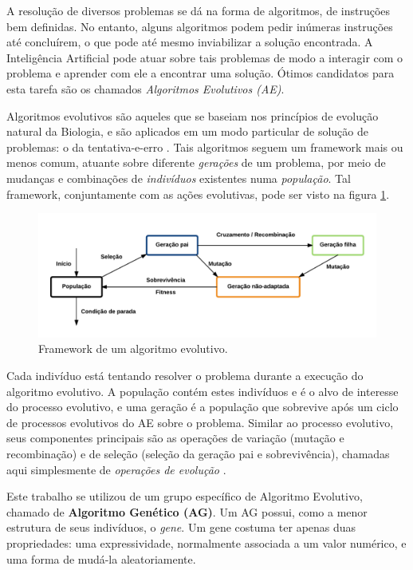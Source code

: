 \label{1_introducao}

A resolução de diversos problemas se dá na forma de algoritmos, de instruções bem definidas. No entanto, alguns algoritmos podem pedir inúmeras instruções até concluírem, o que pode até mesmo inviabilizar a solução encontrada. A Inteligência Artificial pode atuar sobre tais problemas de modo a interagir com o problema e aprender com ele a encontrar uma solução. Ótimos candidatos para esta tarefa são os chamados \emph{Algoritmos Evolutivos (AE)}.

Algoritmos evolutivos são aqueles que se baseiam nos princípios de evolução natural da Biologia, e são aplicados em um modo particular de solução de problemas: o da tentativa-e-erro \cite{eiben2003introduction}. Tais algoritmos seguem um framework mais ou menos comum, atuante sobre diferente \emph{gerações} de um problema, por meio de mudanças e combinações de \emph{indivíduos} existentes numa \emph{população}. Tal framework, conjuntamente com as ações evolutivas, pode ser visto na figura \ref{fig:evolution-framework}.

\begin{figure}[ht!]
    \centering \includegraphics[width=1.0\textwidth]{evolution-framework.png}
    \caption{Framework de um algoritmo evolutivo.}
    \label{fig:evolution-framework}
\end{figure}

Cada indivíduo está tentando resolver o problema durante a execução do algoritmo evolutivo. A população contém estes indivíduos e é o alvo de interesse do processo evolutivo, e uma geração é a população que sobrevive após um ciclo de processos evolutivos do \ac{AE} sobre o problema. Similar ao processo evolutivo, seus componentes principais são as operações de variação (mutação e recombinação) e de seleção (seleção da geração pai e sobrevivência), chamadas aqui simplesmente de \emph{operações de evolução} \cite{eiben2011parameter}.

Este trabalho se utilizou de um grupo específico de Algoritmo Evolutivo, chamado de \textbf{Algoritmo Genético (AG)}. Um AG possui, como a menor estrutura de seus indivíduos, o \emph{gene}. Um gene costuma ter apenas duas propriedades: uma expressividade, normalmente associada a um valor numérico, e uma forma de mudá-la aleatoriamente.

